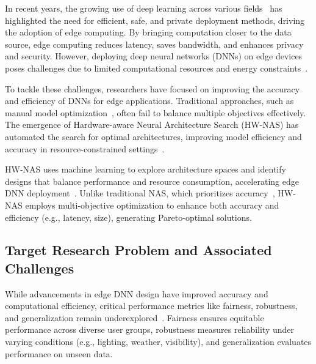 In recent years, the growing use of deep learning across various fields~\cite{yang2021intelligent, macas2022survey, grigorescu2020survey} has highlighted the need for efficient, safe, and private deployment methods, driving the adoption of edge computing. By bringing computation closer to the data source, edge computing reduces latency, saves bandwidth, and enhances privacy and security. However, deploying deep neural networks (DNNs) on edge devices poses challenges due to limited computational resources and energy constraints~\cite{alvear2023edge}.

To tackle these challenges, researchers have focused on improving the accuracy and efficiency of DNNs for edge applications. Traditional approaches, such as manual model optimization~\cite{Marchisio_2018IJCNN_PruNet, vadera2021methods, Hanif_2022MICPRO_EfficientEmbeddedDL, chen2021quantization, matsubara2020head}, often fail to balance multiple objectives effectively. The emergence of Hardware-aware Neural Architecture Search (HW-NAS) has automated the search for optimal architectures, improving model efficiency and accuracy in resource-constrained settings~\cite{benmeziane2021comprehensive}.

HW-NAS uses machine learning to explore architecture spaces and identify designs that balance performance and resource consumption, accelerating edge DNN deployment~\cite{zhang2020fast}. Unlike traditional NAS, which prioritizes accuracy~\cite{he2021automl, elsken2019neural}, HW-NAS employs multi-objective optimization to enhance both accuracy and efficiency (e.g., latency, size)\cite{wistuba2019survey, Marchisio_2020ICCAD_NASCaps, Prabakaran_2021JIOT_BioNetExplorer}, generating Pareto-optimal solutions\cite{Kaisa1999MultiObjective}.



\subsection{Target Research Problem and Associated Challenges}

While advancements in edge DNN design have improved accuracy and computational efficiency, critical performance metrics like fairness, robustness, and generalization remain underexplored~\cite{sheng2022larger}. Fairness ensures equitable performance across diverse user groups, robustness measures reliability under varying conditions (e.g., lighting, weather, visibility)\cite{drenkow2021systematic, porrello2020robust}, and generalization evaluates performance on unseen data\cite{zhou2022domain}.


